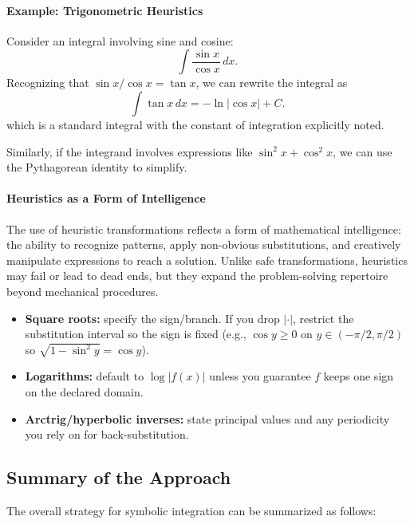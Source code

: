 \paragraph{Example: Trigonometric Heuristics}

Consider an integral involving sine and cosine:
\[
\int \frac{\sin x}{\cos x} \, dx.
\]
Recognizing that \(\sin x / \cos x = \tan x\), we can rewrite the integral as
\[
\int \tan x \, dx = -\ln|\cos x| + C.
\]
which is a standard integral with the constant of integration explicitly noted.

Similarly, if the integrand involves expressions like \(\sin^2 x + \cos^2 x\), we can use the Pythagorean identity to simplify.

\paragraph{Heuristics as a Form of Intelligence}

The use of heuristic transformations reflects a form of mathematical intelligence: the ability to recognize patterns, apply non-obvious substitutions, and creatively manipulate expressions to reach a solution. Unlike safe transformations, heuristics may fail or lead to dead ends, but they expand the problem-solving repertoire beyond mechanical procedures.

\begin{tcolorbox}[summarybox, title={Absolute values and branches}]
\begin{itemize}
    \item \textbf{Square roots:} specify the sign/branch. If you drop \(|\cdot|\), restrict the substitution interval so the sign is fixed (e.g., \(\cos y \ge 0\) on \(y\in(-\pi/2,\pi/2)\) so \(\sqrt{1-\sin^2 y}=\cos y\)).
    \item \textbf{Logarithms:} default to \(\log|f(x)|\) unless you guarantee \(f\) keeps one sign on the declared domain.
    \item \textbf{Arctrig/hyperbolic inverses:} state principal values and any periodicity you rely on for back-substitution.
\end{itemize}
\end{tcolorbox}


\subsection{Summary of the Approach}
\label{sec:symbolic_summary_of_the_approach}

The overall strategy for symbolic integration can be summarized as follows:

